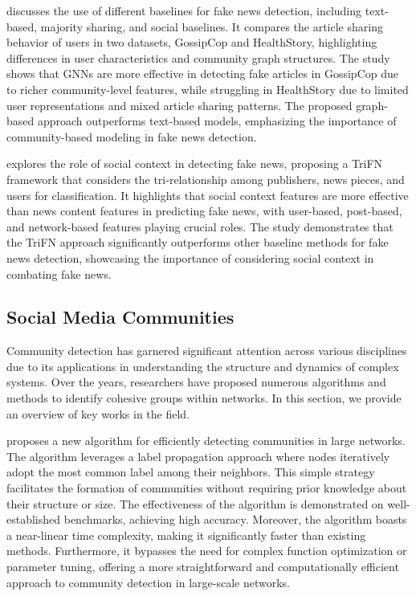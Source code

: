 \documentclass[12pt]{article}
\begin{document}
\cite{chandra2020graphbased} discusses the use of different baselines for fake news detection, including text-based, 
majority sharing, and social baselines. It compares the article sharing behavior of users in two datasets, 
GossipCop and HealthStory, highlighting differences in user characteristics and community graph structures. 
The study shows that GNNs are more effective in detecting fake articles in GossipCop due to richer community-level features, 
while struggling in HealthStory due to limited user representations and mixed article sharing patterns. 
The proposed graph-based approach outperforms text-based models, emphasizing the importance of community-based modeling in fake news detection.

\cite{shu2018news} explores the role of social context in detecting fake news, proposing a TriFN framework that considers the tri-relationship 
among publishers, news pieces, and users for classification. It highlights that social context features are more effective 
than news content features in predicting fake news, with user-based, post-based, and network-based features playing crucial roles.
The study demonstrates that the TriFN approach significantly outperforms other baseline methods for fake news detection, 
showcasing the importance of considering social context in combating fake news.


\subsection{Social Media Communities}

Community detection has garnered significant attention across various disciplines due to its applications 
in understanding the structure and dynamics of complex systems.
Over the years, researchers have proposed numerous algorithms and methods to identify cohesive groups within networks. 
In this section, we provide an overview of key works in the field.

\cite{Raghavan_2007} proposes a new algorithm for efficiently detecting communities in large networks. 
The algorithm leverages a label propagation approach where nodes iteratively adopt the most 
common label among their neighbors. This simple strategy facilitates the formation of communities without 
requiring prior knowledge about their structure or size. The effectiveness of the algorithm is demonstrated 
on well-established benchmarks, achieving high accuracy. Moreover, the algorithm boasts a near-linear time complexity,
making it significantly faster than existing methods. Furthermore, it bypasses the need for complex function 
optimization or parameter tuning, offering a more straightforward and 
computationally efficient approach to community detection in large-scale networks.
\end{document}

